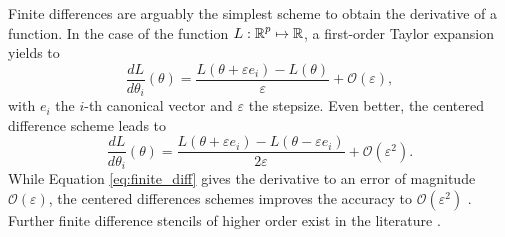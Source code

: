 Finite differences are arguably the simplest scheme to obtain the derivative of a function. 
In the case of the function $L : \operatorname{\mathbb{R}}^p \mapsto \operatorname{\mathbb{R}}$, a first-order Taylor expansion yields to 
\begin{equation}
 \frac{dL}{d\theta_i} (\theta) = \frac{L(\theta + \varepsilon e_i ) - L(\theta)}{\varepsilon} + \mathcal O (\varepsilon),
 \label{eq:finite_diff}
\end{equation}
with $e_i$ the $i$-th canonical vector and $\varepsilon$ the stepsize. 
Even better, the centered difference scheme leads to
\begin{equation}
 \frac{dL}{d\theta_i} (\theta) 
 =
 \frac{L(\theta + \varepsilon e_i ) - L(\theta - \varepsilon e_i)}{2\varepsilon}
 + \mathcal O (\varepsilon^2).
 \label{eq:finite_diff2}
\end{equation}
While Equation \eqref{eq:finite_diff} gives the derivative to an error of magnitude $\mathcal O (\varepsilon)$, the centered differences schemes improves the accuracy to $\mathcal O (\varepsilon^2)$ \cite{ascher2008-numerical-methods}. 
Further finite difference stencils of higher order exist in the literature \cite{Fornberg1988}. 
 
